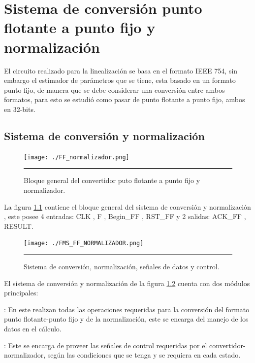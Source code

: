 \chapter{Sistema de conversión punto flotante a punto fijo y normalización }
\label{ch:Normalizacion}

El circuito realizado para la linealización se basa en el formato IEEE 754, sin embargo el estimador de parámetros que se tiene, esta basado en un formato punto fijo, de manera que se debe considerar una conversión entre ambos formatos, para esto se estudió como pasar de punto flotante a punto fijo, ambos en 32-bits.


\section{Sistema de conversión y normalización }

\begin{figure}[H]
  \centering
    \texttt{[image: ./FF\_normalizador.png]}
    \rule{35em}{0.5pt}
  \caption[Bloque general del convertidor puto flotante a punto fijo y normalizador]{Bloque general del convertidor puto flotante a punto fijo y normalizador. }
  \label{fig:FF-NORM}
\end{figure}


La figura \ref{fig:FF-NORM} contiene el bloque general del sistema de conversión y normalización , este posee 4 entradas: CLK , F , Begin\_FF , RST\_FF y 2 salidas: ACK\_FF , RESULT.

\begin{figure}[H]
  \centering
    \texttt{[image: ./FMS\_FF\_NORMALIZADOR.png]}
    \rule{35em}{0.5pt}
  \caption[Sistema de convesión, normalización, señales de datos y control]{Sistema de conversión, normalización, señales de datos y control.}
  \label{fig:FMS_FF_NORM}
\end{figure}

El sistema de conversión y normalización de la figura \ref{fig:FMS_FF_NORM} cuenta con dos módulos principales: 

\begin{compactitem}

\item {}: En este realizan todas las operaciones requeridas para la conversión del formato punto flotante-punto fijo y de la normalización, este se encarga del manejo de los datos en el cálculo. 


\item {}: Este se encarga de proveer las señales de control requeridas por el convertidor-normalizador, según las condiciones que se tenga y se requiera en cada estado.

\end{compactitem}

